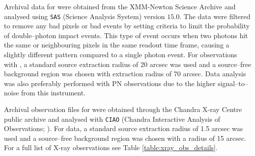 Archival data for \XMM were obtained from the XMM-Newton Science Archive and analysed using \texttt{SAS} (Science Analysis System) version $15.0$. The data were filtered to remove any bad pixels or bad events by setting criteria to limit the probability of double--photon impact events. This type of event occurs when two photons hit the same or neighbouring pixels in the same readout time frame, causing a slightly different pattern compared to a single photon event. For observations with \XMM, a standard source extraction radius of 20 arcsec was used and a source--free background region was chosen with extraction radius of 70 arcsec. Data analysis was also preferably performed with PN observations due to the higher signal--to--noise from this instrument.

Archival observation files for \Chandra were obtained through the Chandra X-ray Centre public archive and analysed with \texttt{CIAO} (Chandra Interactive Analysis of Observations; \citealt{Fruscione_etal_2006}). For \Chandra data, a standard source extraction radius of 1.5 arcsec was used and a source--free background region was chosen with a radius of 15 arcsec. For a full list of X-ray observations see Table \ref{table:xray_obs_details}.

